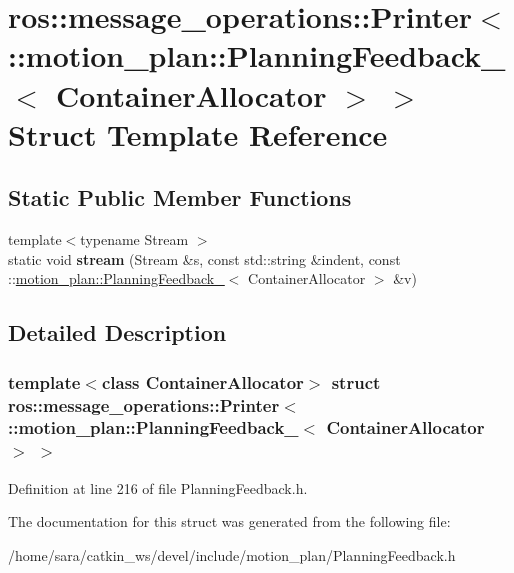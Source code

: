 \hypertarget{structros_1_1message__operations_1_1Printer_3_01_1_1motion__plan_1_1PlanningFeedback___3_01ContainerAllocator_01_4_01_4}{}\section{ros\+:\+:message\+\_\+operations\+:\+:Printer$<$ \+:\+:motion\+\_\+plan\+:\+:Planning\+Feedback\+\_\+$<$ Container\+Allocator $>$ $>$ Struct Template Reference}
\label{structros_1_1message__operations_1_1Printer_3_01_1_1motion__plan_1_1PlanningFeedback___3_01ContainerAllocator_01_4_01_4}
\subsection*{Static Public Member Functions}
\begin{DoxyCompactItemize}
\item 
\mbox{\label{structros_1_1message__operations_1_1Printer_3_01_1_1motion__plan_1_1PlanningFeedback___3_01ContainerAllocator_01_4_01_4_a46350fdda070e58c32bfff347155ed40}} 
{\footnotesize template$<$typename Stream $>$ }\\static void {\bfseries stream} (Stream \&s, const std\+::string \&indent, const \+::\hyperlink{structmotion__plan_1_1PlanningFeedback__}{motion\+\_\+plan\+::\+Planning\+Feedback\+\_\+}$<$ Container\+Allocator $>$ \&v)
\end{DoxyCompactItemize}


\subsection{Detailed Description}
\subsubsection*{template$<$class Container\+Allocator$>$\newline
struct ros\+::message\+\_\+operations\+::\+Printer$<$ \+::motion\+\_\+plan\+::\+Planning\+Feedback\+\_\+$<$ Container\+Allocator $>$ $>$}



Definition at line 216 of file Planning\+Feedback.\+h.



The documentation for this struct was generated from the following file\+:\begin{DoxyCompactItemize}
\item 
/home/sara/catkin\+\_\+ws/devel/include/motion\+\_\+plan/Planning\+Feedback.\+h\end{DoxyCompactItemize}
